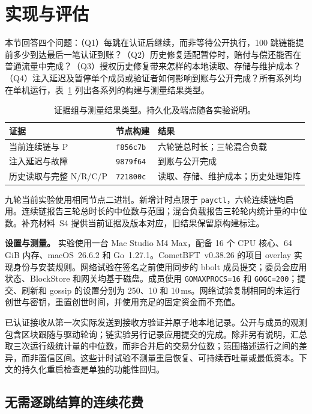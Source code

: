 \section{实现与评估}
\label{sec:evaluation}
本节回答四个问题：（Q1）每跳在认证后继续，而非等待公开执行，100 跳链能提前多少到达最后一笔认证到账？（Q2）历史修复适配暂停时，赔付与偿还能否在普通流量中完成？（Q3）授权历史修复带来怎样的本地读取、存储与维护成本？（Q4）注入延迟及暂停单个成员或验证者如何影响到账与公开完成？所有系列均在单机运行，表~\ref{tab:eval-builds} 列出各系列的构建与测量结果类型。


\begin{table}[!t]
\caption{证据组与测量结果类型。持久化及端点随各实验说明。}
\label{tab:eval-builds}
\centering\small
\setlength{\tabcolsep}{3pt}
\begin{tabular}{@{}p{}p{}p{}@{}}
\toprule
证据 & 节点构建 & 结果 \\
\midrule
当前连续链与 P & \texttt{f856c7b} & 六轮链总时长；三轮混合负载 \\
注入延迟与故障 & \texttt{9879f64} & 到账与公开完成 \\
历史读取与完整 N/R/C/P & \texttt{721800c} & 读取、存储、维护成本；历史处理矩阵 \\
\bottomrule
\end{tabular}
\end{table}

九轮当前实验使用相同节点二进制。新增计时点限于 \texttt{payctl}，六轮连续链均启用。连续链报告三轮总时长的中位数与范围；混合负载报告三轮轮内统计量的中位数。补充材料~S4 提供当前证据及版本对应，旧结果保留原构建标注。

\noindent\textbf{设置与测量。}
实验使用一台 Mac Studio M4 Max，配备 16 个 CPU 核心、64\,GiB 内存、macOS~26.6.2 和 Go~1.27.1。CometBFT~v0.38.26 的项目 overlay 实现身份与安装规则。网络试验在签名之前使用同步的 bbolt 成员提交；委员会应用状态、BlockStore 和网关均基于磁盘。成员使用 \texttt{GOMAXPROCS=16} 和 \texttt{GOGC=200}；提交、刷新和 gossip 的设置分别为 250、10 和 10\,ms。网络试验复制相同的未运行创世与密钥，重置创世时间，并使用充足的固定资金而不充值。

已认证接收从第一次实际发送到接收方验证并原子地本地记录。公开与成员的观测包含区块跟随与驱动轮询；链实验另行记录应用提交的完成。除非另有说明，汇总取三次运行级统计量的中位数，而非合并后的交易分位数；范围描述运行之间的差异，而非置信区间。这些计时试验不测量重启恢复、可持续吞吐量或最低资本。下文的持久化重启检查是单独的功能性回归。

\subsection{无需逐跳结算的连续花费}
\label{sec:eval-continuation}


